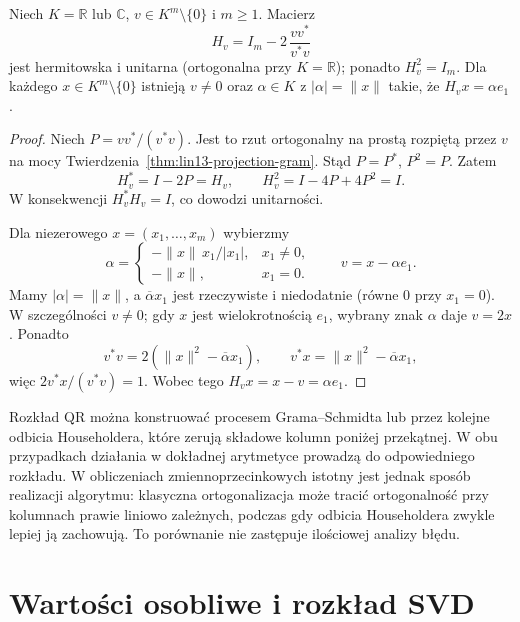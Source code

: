 \begin{stwierdzenie}
\label{prop:lin15-householder}
Niech \(K=\mathbb R\) lub \(\mathbb C\),
\(v\in K^m\setminus\{0\}\) i \(m\ge1\).
Macierz
\[
 H_v=I_m-2\,\frac{vv^*}{v^*v}
\]
jest hermitowska i unitarna
(ortogonalna przy \(K=\mathbb R\));
ponadto \(H_v^2=I_m\).
Dla każdego \(x\in K^m\setminus\{0\}\)
istnieją \(v\ne0\) oraz
\(\alpha\in K\) z
\(|\alpha|=\|x\|\) takie, że
\(H_vx=\alpha e_1\).
\end{stwierdzenie}
\begin{proof}
Niech \(P=vv^*/(v^*v)\).
Jest to rzut ortogonalny
na prostą rozpiętą przez \(v\)
na mocy
Twierdzenia~\ref{thm:lin13-projection-gram}.
Stąd \(P=P^*\), \(P^2=P\).
Zatem
\[
 H_v^*=I-2P=H_v,\qquad
 H_v^2=I-4P+4P^2=I.
\]
W konsekwencji
\(H_v^*H_v=I\), co dowodzi
unitarności.

Dla niezerowego \(x=(x_1,\ldots,x_m)\)
wybierzmy
\[
 \alpha=
 \begin{cases}
 -\|x\|\,x_1/|x_1|,&x_1\ne0,\\
 -\|x\|,&x_1=0.
 \end{cases}
 \qquad v=x-\alpha e_1.
\]
Mamy \(|\alpha|=\|x\|\),
a \(\overline\alpha x_1\)
jest rzeczywiste i niedodatnie
(równe \(0\) przy \(x_1=0\)).
W szczególności \(v\ne0\);
gdy \(x\) jest wielokrotnością \(e_1\),
wybrany znak \(\alpha\)
daje \(v=2x\).
Ponadto
\[
 v^*v
 =2(\|x\|^2-\overline\alpha x_1),
 \qquad
 v^*x=\|x\|^2-\overline\alpha x_1,
\]
więc \(2v^*x/(v^*v)=1\).
Wobec tego
\(H_vx=x-v=\alpha e_1\).
\end{proof}

\begin{uwaga}
\label{rem:lin15-qr-algorithms}
Rozkład QR można konstruować
procesem Grama--Schmidta lub
przez kolejne odbicia Householdera,
które zerują składowe kolumn
poniżej przekątnej.
W obu przypadkach działania
w dokładnej arytmetyce prowadzą
do odpowiedniego rozkładu.
W obliczeniach zmiennoprzecinkowych
istotny jest jednak sposób
realizacji algorytmu: klasyczna
ortogonalizacja może tracić
ortogonalność przy kolumnach
prawie liniowo zależnych,
podczas gdy odbicia Householdera
zwykle lepiej ją zachowują.
To porównanie nie zastępuje
ilościowej analizy błędu.
\end{uwaga}

\section{Wartości osobliwe i rozkład SVD}
\label{sec:lin15-svd}

